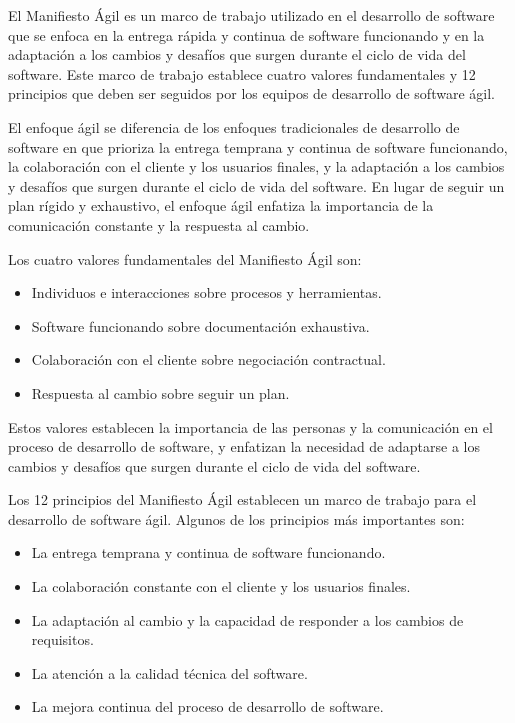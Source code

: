 \documentclass[executivepaper]{article}
\begin{document}
El Manifiesto Ágil es un marco de trabajo utilizado en el desarrollo de software que se enfoca en la entrega rápida y continua de software funcionando y en la adaptación a los cambios y desafíos que surgen durante el ciclo de vida del software. Este marco de trabajo establece cuatro valores fundamentales y 12 principios que deben ser seguidos por los equipos de desarrollo de software ágil.

El enfoque ágil se diferencia de los enfoques tradicionales de desarrollo de software en que prioriza la entrega temprana y continua de software funcionando, la colaboración con el cliente y los usuarios finales, y la adaptación a los cambios y desafíos que surgen durante el ciclo de vida del software. En lugar de seguir un plan rígido y exhaustivo, el enfoque ágil enfatiza la importancia de la comunicación constante y la respuesta al cambio.

Los cuatro valores fundamentales del Manifiesto Ágil son:

\begin{itemize}
\item Individuos e interacciones sobre procesos y herramientas.
\item Software funcionando sobre documentación exhaustiva.
\item Colaboración con el cliente sobre negociación contractual.
\item Respuesta al cambio sobre seguir un plan.
\end{itemize}

Estos valores establecen la importancia de las personas y la comunicación en el proceso de desarrollo de software, y enfatizan la necesidad de adaptarse a los cambios y desafíos que surgen durante el ciclo de vida del software.

Los 12 principios del Manifiesto Ágil establecen un marco de trabajo para el desarrollo de software ágil. Algunos de los principios más importantes son:

\begin{itemize}
\item La entrega temprana y continua de software funcionando.
\item La colaboración constante con el cliente y los usuarios finales.
\item La adaptación al cambio y la capacidad de responder a los cambios de requisitos.
\item La atención a la calidad técnica del software.
\item La mejora continua del proceso de desarrollo de software.
\end{itemize}
\end{document}
